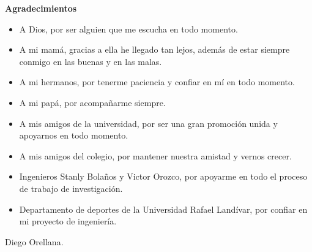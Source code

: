 \afterpage{\blankpage}
\newpage
{\LARGE \textbf{Agradecimientos}}\\[2cm]
\begin{itemize}
\item A Dios, por ser alguien que me escucha en todo momento.
\item A mi mam\'a, gracias a ella he llegado tan lejos, adem\'as de estar siempre conmigo en las buenas y en las malas. 
\item A mi hermanos, por tenerme paciencia y confiar en m\'i en todo momento.
\item A mi pap\'a, por acompa\~narme siempre.
\item A mis amigos de la universidad, por ser una gran promoci\'on unida y apoyarnos en todo momento.
\item A mis amigos del colegio, por mantener nuestra amistad y vernos crecer.
\item Ingenieros Stanly Bola\~nos y Victor Orozco, por apoyarme en todo el proceso de trabajo de investigaci\'on.
\item Departamento de deportes de la Universidad Rafael Land\'ivar, por confiar en mi proyecto de ingenier\'ia.
\end{itemize}
\begin{center}
Diego Orellana.
\end{center}